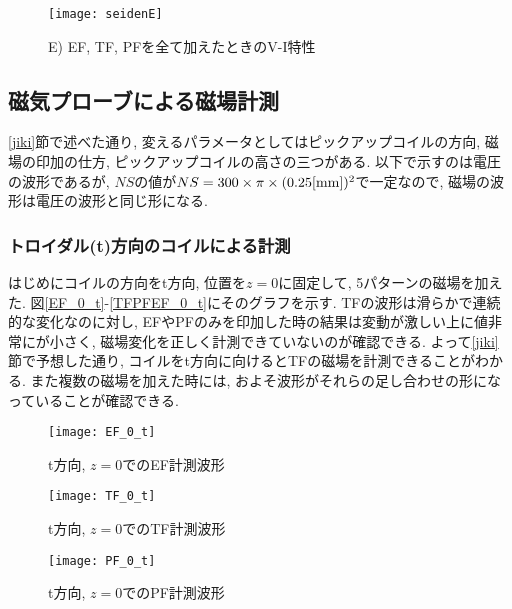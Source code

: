 \documentclass[]{jsarticle}
\begin{document}
	\begin{figure}[htbp]
	\begin{center}
	\texttt{[image: seidenE]}
	\caption{E) EF, TF, PFを全て加えたときのV-I特性}
	\label{seidenE}
	\end{center}
	\end{figure}

	
	\subsection{磁気プローブによる磁場計測\label{jiki_results}}
		\ref{jiki}節で述べた通り, 変えるパラメータとしてはピックアップコイルの方向, 磁場の印加の仕方, ピックアップコイルの高さの三つがある. 以下で示すのは電圧の波形であるが,  $NS$の値が$NS = 300 \times \pi \times (0.25[\rm{mm}])^2 $で一定なので, 磁場の波形は電圧の波形と同じ形になる. 
		
		\subsubsection{トロイダル(t)方向のコイルによる計測}
		はじめにコイルの方向をt方向, 位置を$z = 0$に固定して, 5パターンの磁場を加えた. 図\ref{EF_0_t}-\ref{TFPFEF_0_t}にそのグラフを示す. TFの波形は滑らかで連続的な変化なのに対し, EFやPFのみを印加した時の結果は変動が激しい上に値非常にが小さく, 磁場変化を正しく計測できていないのが確認できる. よって\ref{jiki}節で予想した通り, コイルをt方向に向けるとTFの磁場を計測できることがわかる. また複数の磁場を加えた時には, およそ波形がそれらの足し合わせの形になっていることが確認できる. 
		
		\begin{figure}[htbp]
	
		\begin{minipage}{0.33\hsize}
			\begin{center}
				\texttt{[image: EF\_0\_t]}
				\caption{t方向, $z = 0$でのEF計測波形}
				\label{EF_0_t}
			\end{center}
		\end{minipage}
		\begin{minipage}{0.33\hsize}
			\begin{center}
				\texttt{[image: TF\_0\_t]}
				\caption{t方向, $z = 0$でのTF計測波形}
				\label{TF_0_t}
			\end{center}
		\end{minipage}
		\begin{minipage}{0.33\hsize}
			\begin{center}
				\texttt{[image: PF\_0\_t]}
				\caption{t方向, $z = 0$でのPF計測波形}
				\label{PF_0_t}
			\end{center}
		\end{minipage}
		
		\end{figure}
		
\end{document}
